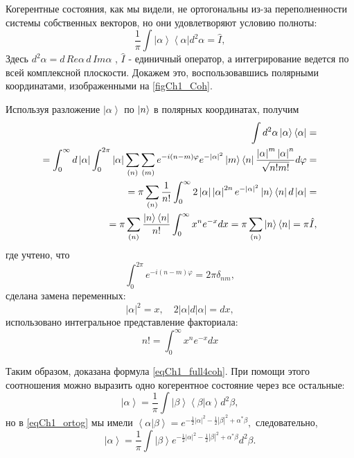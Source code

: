 Когерентные состояния, как мы видели, не ортогональны из-за
переполненности системы собственных векторов, но они удовлетворяют
условию полноты: 
\begin{equation}
\frac{1}{\pi}\int \left|\alpha\right>\left<\alpha\right| d^2 \alpha =
\hat{I},
\label{eqCh1_full4coh}
\end{equation}
Здесь $d^2 \alpha = d\, Re \alpha\, d\, Im \alpha$ , $\hat{I}$ - единичный
оператор, а интегрирование ведется по всей комплексной
плоскости. Докажем это, воспользовавшись полярными координатами,
изображенными на \autoref{figCh1_Coh}.  



Используя разложение $\left|\alpha\right>$ по $\ket{n}$ в
полярных координатах, получим 
\begin{eqnarray}
\int d^2 \alpha \left|\alpha\right>\left<\alpha\right| =
\nonumber \\
=
\int_0^{\infty} d \left|\alpha\right|\int_0^{2
  \pi}\left|\alpha\right|\sum_{(n)}\sum_{(m)}e^{-i \left(n -
  m\right)\varphi}
e^{-\left|\alpha\right|^2}\ket{m}\bra{n}
\frac{\left|\alpha\right|^m \left|\alpha\right|^n}{\sqrt{n! m!}} d\varphi
= 
\nonumber \\
= \pi \sum_{(n)}\frac{1}{n!}\int_0^{\infty} 2
\left|\alpha\right|\left|\alpha\right|^{2n} e^{-\left|\alpha\right|^2} 
\ket{n}\bra{n}
d\left|\alpha\right| = 
\nonumber \\
=
\pi
\sum_{(n)}\frac{\ket{n}\bra{n}}{n!} \int_0^{\infty}x^n
e^{-x}dx = 
\pi \sum_{(n)}\ket{n}\bra{n} = \pi \hat{I},
\end{eqnarray}
где учтено, что
\[
\int_0^{2\pi} e^{-i \left(n - m\right)\varphi} = 2 \pi \delta_{nm},
\]
сделана замена переменных:  
\[
\left|\alpha\right|^2 = x, \quad 2 \left|\alpha\right| d
\left|\alpha\right| = d x,
\]
использовано интегральное представление факториала:
\[
n! = \int_0^{\infty}x^ne^{-x}dx
\]

Таким образом, доказана формула \eqref{eqCh1_full4coh}. При помощи
этого соотношения можно выразить одно когерентное состояние через все
остальные: 
\[
\left|\alpha\right> = \frac{1}{\pi}\int\left|\beta\right>\left<\beta\right|\left.\alpha\right> d^2 \beta,
\]
но в \eqref{eqCh1_ortog} мы имели
\(
\left<\alpha\right|\left.\beta\right> = 
e^{
-\frac{1}{2} \left|\alpha\right|^2  -\frac{1}{2} \left|\beta\right|^2
+
\alpha^{*} \beta
},
\)
следовательно,
\begin{equation}
\left|\alpha\right> = \frac{1}{\pi}\int\left|\beta\right>
e^{
-\frac{1}{2} \left|\alpha\right|^2  -\frac{1}{2} \left|\beta\right|^2
+
\alpha^{*} \beta
} d^2 \beta.
\end{equation}
